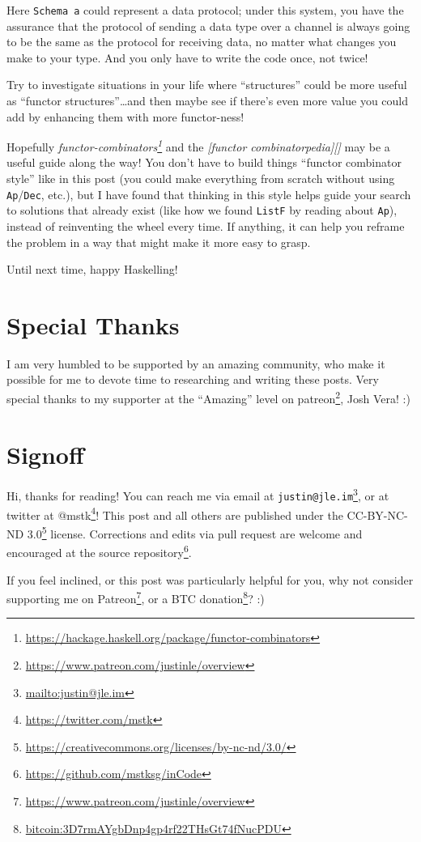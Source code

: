 \documentclass[]{article}
\renewcommand{\href}[2]{#2\footnote{\url{#1}}}
\begin{document}
Here \texttt{Schema\ a} could represent a data protocol; under this system, you
have the assurance that the protocol of sending a data type over a channel is
always going to be the same as the protocol for receiving data, no matter what
changes you make to your type. And you only have to write the code once, not
twice!

Try to investigate situations in your life where ``structures'' could be more
useful as ``functor structures''\ldots and then maybe see if there's even more
value you could add by enhancing them with more functor-ness!

Hopefully
\emph{\href{https://hackage.haskell.org/package/functor-combinators}{functor-combinators}}
and the \emph{{[}functor combinatorpedia{]}{[}{]}} may be a useful guide along
the way! You don't have to build things ``functor combinator style'' like in
this post (you could make everything from scratch without using
\texttt{Ap}/\texttt{Dec}, etc.), but I have found that thinking in this style
helps guide your search to solutions that already exist (like how we found
\texttt{ListF} by reading about \texttt{Ap}), instead of reinventing the wheel
every time. If anything, it can help you reframe the problem in a way that might
make it more easy to grasp.

Until next time, happy Haskelling!

\hypertarget{special-thanks}{%
\section{Special Thanks}\label{special-thanks}}

I am very humbled to be supported by an amazing community, who make it possible
for me to devote time to researching and writing these posts. Very special
thanks to my supporter at the ``Amazing'' level on
\href{https://www.patreon.com/justinle/overview}{patreon}, Josh Vera! :)

\hypertarget{signoff}{%
\section{Signoff}\label{signoff}}

Hi, thanks for reading! You can reach me via email at
\href{mailto:justin@jle.im}{\nolinkurl{justin@jle.im}}, or at twitter at
\href{https://twitter.com/mstk}{@mstk}! This post and all others are published
under the \href{https://creativecommons.org/licenses/by-nc-nd/3.0/}{CC-BY-NC-ND
3.0} license. Corrections and edits via pull request are welcome and encouraged
at \href{https://github.com/mstksg/inCode}{the source repository}.

If you feel inclined, or this post was particularly helpful for you, why not
consider \href{https://www.patreon.com/justinle/overview}{supporting me on
Patreon}, or a \href{bitcoin:3D7rmAYgbDnp4gp4rf22THsGt74fNucPDU}{BTC donation}?
:)
\end{document}
